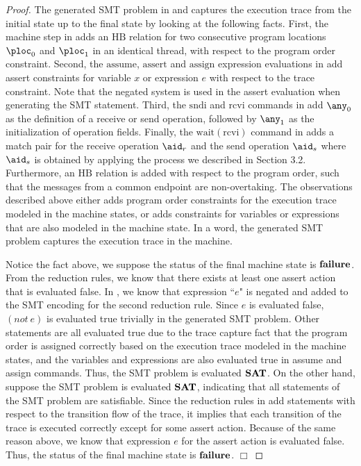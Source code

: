 \begin{proof}
The generated SMT problem in  and  captures the execution trace from the initial state up to the final state by looking at the following facts. First, the machine step in  adds an $\mathrm{HB}$ relation for two consecutive program locations $\ploc_0$ and $\ploc_1$ in an identical thread, with respect to the program order constraint. Second, the $\mathrm{assume}$, $\mathrm{assert}$ and $\mathrm{assign}$ expression evaluations in  add assert constraints for variable $x$ or expression $e$ with respect to the trace constraint. Note that the negated system is used in the assert evaluation when generating the SMT statement. Third, the $\mathrm{sndi}$ and $\mathrm{rcvi}$ commands in  add $\any_0$ as the definition of a receive or send operation, followed by $\any_1$ as the initialization of operation fields. Finally, the $\mathrm{wait(rcvi)}$ command in  adds a match pair for the receive operation $\aid_r$ and the send operation $\aid_s$ where $\aid_s$ is obtained by applying the process we described in Section 3.2. Furthermore, an $\mathrm{HB}$ relation is added with respect to the program order, such that the messages from a common endpoint are non-overtaking. The observations described above either adds program order constraints for the execution trace modeled in the machine states, or adds constraints for variables or expressions that are also modeled in the machine state. In a word, the generated SMT problem captures the execution trace in the machine.

Notice the fact above, we suppose the status of the final machine state is $\textbf{failure}$. From the reduction rules, we know that there exists at least one assert action that is evaluated false. In , we know that expression ``$e$" is negated and added to the SMT encoding for the second reduction rule. Since $e$ is evaluated false, $(not\ e)$ is evaluated true trivially in the generated SMT problem. Other statements are all evaluated true due to the trace capture fact that the program order is assigned correctly based on the execution trace modeled in the machine states, and the variables and expressions are also evaluated true in assume and assign commands. Thus, the SMT problem is evaluated $\textbf{SAT}$.
On the other hand, suppose the SMT problem is evaluated $\textbf{SAT}$, indicating that all statements of the SMT problem are satisfiable. Since the reduction rules in  add statements with respect to the transition flow of the trace, it implies that each transition of the trace is executed correctly except for some assert action. Because of the same reason above, we know that expression $e$ for the assert action is evaluated false. Thus, the status of the final machine state is $\textbf{failure}$.
$\Box$
\end{proof}


